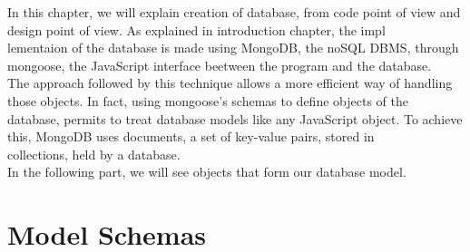 
In this chapter, we will explain creation of database, from code point of view and design point of view. As explained in introduction chapter, the impl\\
lementaion of the database is made using MongoDB, the noSQL DBMS, through mongoose, the JavaScript interface beetween the program and the database.
\\
The approach followed by this technique allows a more efficient way of handling those objects. In fact, using mongoose's schemas to define objects of the\\
database, permits to treat database models like any JavaScript object. To achieve this, MongoDB uses documents, a set of key-value pairs, stored in \\
collections, held by a database. 
\\
In the following part, we will see objects that form our database model.

\section{Model Schemas}
